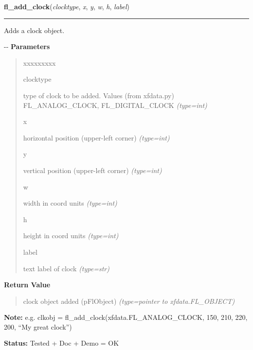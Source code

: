     \vspace{0.5ex}

\hspace{.8\funcindent}\begin{boxedminipage}{\funcwidth}

    \raggedright \textbf{fl\_add\_clock}(\textit{clocktype}, \textit{x}, \textit{y}, \textit{w}, \textit{h}, \textit{label})

    \vspace{-1.5ex}

    \rule{\textwidth}{0.5\fboxrule}
\setlength{\parskip}{2ex}

Adds a clock object.

-{}-
\setlength{\parskip}{1ex}
      \textbf{Parameters}
      \vspace{-1ex}

      \begin{quote}
        \begin{Ventry}{xxxxxxxxx}

          \item[clocktype]


type of clock to be added. Values (from xfdata.py) FL\_ANALOG\_CLOCK,
FL\_DIGITAL\_CLOCK
            {\it (type=int)}

          \item[x]


horizontal position (upper-left corner)
            {\it (type=int)}

          \item[y]


vertical position (upper-left corner)
            {\it (type=int)}

          \item[w]


width in coord units
            {\it (type=int)}

          \item[h]


height in coord units
            {\it (type=int)}

          \item[label]


text label of clock
            {\it (type=str)}

        \end{Ventry}

      \end{quote}

      \textbf{Return Value}
    \vspace{-1ex}

      \begin{quote}

clock object added (pFlObject)
      {\it (type=pointer to xfdata.FL\_OBJECT)}

      \end{quote}

\textbf{Note:} 
e.g. clkobj = fl\_add\_clock(xfdata.FL\_ANALOG\_CLOCK, 150, 210,
220, 200, ``My great clock'')


\textbf{Status:} 
Tested + Doc + Demo = OK


    \end{boxedminipage}

